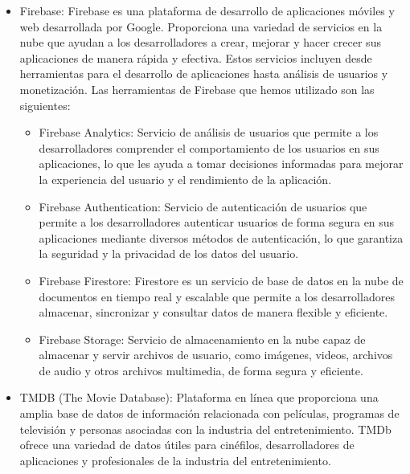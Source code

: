 \documentclass{article}
\begin{document}
    \begin{itemize}
        \item Firebase: Firebase es una plataforma de desarrollo de aplicaciones móviles y web desarrollada por Google. Proporciona una variedad de servicios en la nube que ayudan a los desarrolladores a crear, mejorar y hacer crecer sus aplicaciones de manera rápida y efectiva. Estos servicios incluyen desde herramientas para el desarrollo de aplicaciones hasta análisis de usuarios y monetización. Las herramientas de Firebase que hemos utilizado son las siguientes:
    
        \begin{itemize}
            \item Firebase Analytics: Servicio de análisis de usuarios que permite a los desarrolladores comprender el comportamiento de los usuarios en sus aplicaciones, lo que les ayuda a tomar decisiones informadas para mejorar la experiencia del usuario y el rendimiento de la aplicación.
    
            \item Firebase Authentication: Servicio de autenticación de usuarios que permite a los desarrolladores autenticar usuarios de forma segura en sus aplicaciones mediante diversos métodos de autenticación, lo que garantiza la seguridad y la privacidad de los datos del usuario.
    
            \item Firebase Firestore: Firestore es un servicio de base de datos en la nube de documentos en tiempo real y escalable que permite a los desarrolladores almacenar, sincronizar y consultar datos de manera flexible y eficiente.
    
            \item Firebase Storage: Servicio de almacenamiento en la nube capaz de almacenar y servir archivos de usuario, como imágenes, videos, archivos de audio y otros archivos multimedia, de forma segura y eficiente.
        \end{itemize}
    
        \item TMDB (The Movie Database): Plataforma en línea que proporciona una amplia base de datos de información relacionada con películas, programas de televisión y personas asociadas con la industria del entretenimiento. TMDb ofrece una variedad de datos útiles para cinéfilos, desarrolladores de aplicaciones y profesionales de la industria del entretenimiento.
    \end{itemize}
\end{document}
